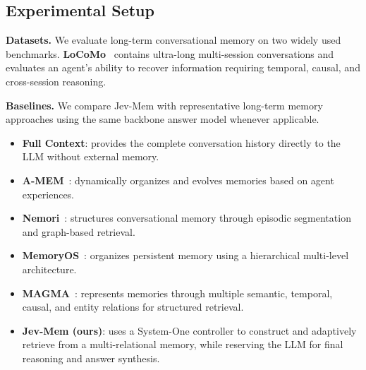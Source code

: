 \documentclass[11pt]{article}
\begin{document}
\subsection{Experimental Setup}
\label{sec:exp_setup}

\noindent\textbf{Datasets.}
We evaluate long-term conversational memory on two widely used benchmarks.
\textbf{LoCoMo}~\citep{maharana2024evaluating} contains ultra-long multi-session conversations and evaluates an agent's ability to recover information requiring temporal, causal, and cross-session reasoning.

\noindent\textbf{Baselines.}
We compare Jev-Mem with representative long-term memory approaches using the same backbone answer model whenever applicable.
\begin{itemize}[leftmargin=*, itemsep=0pt, topsep=2pt]
    \item \textbf{Full Context}: provides the complete conversation history directly to the LLM without external memory.
    
    \item \textbf{A-MEM}~\citep{xu2025mem}: dynamically organizes and evolves memories based on agent experiences.
    
    \item \textbf{Nemori}~\citep{nan2025nemori}: structures conversational memory through episodic segmentation and graph-based retrieval.
    
    \item \textbf{MemoryOS}~\citep{kang2025memory}: organizes persistent memory using a hierarchical multi-level architecture.
    
    \item \textbf{MAGMA}~\cite{jiang2026magma}: represents memories through multiple semantic, temporal, causal, and entity relations for structured retrieval.

    \item \textbf{Jev-Mem (ours)}: uses a System-One controller to construct and adaptively retrieve from a multi-relational memory, while reserving the LLM for final reasoning and answer synthesis.
\end{itemize}
\end{document}

